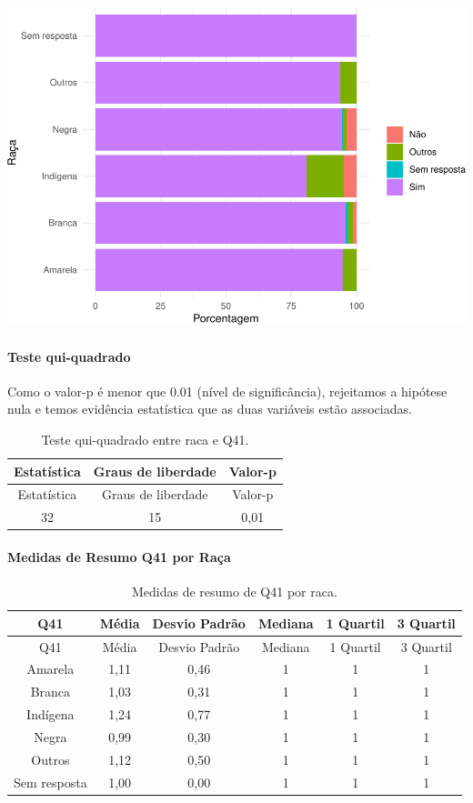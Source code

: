 \documentclass[]{article}
\let\oldparagraph\paragraph
\renewcommand{\paragraph}[1]{\oldparagraph{#1}\mbox{}}
\begin{document}
\begin{center}\includegraphics[width=0.75\linewidth]{relatorio_covid19_files/figure-latex/unnamed-chunk-1636-1} \end{center}

\hypertarget{teste-qui-quadrado-140}{%
\paragraph{Teste qui-quadrado}\label{teste-qui-quadrado-140}}

Como o valor-p é menor que 0.01 (nível de significância), rejeitamos a hipótese nula e temos evidência estatística que as duas variáveis estão associadas.

\begin{longtable}[]{@{}ccc@{}}
\caption{\label{tab:unnamed-chunk-1638}Teste qui-quadrado entre raca e Q41.}\tabularnewline
\toprule
Estatística & Graus de liberdade & Valor-p\tabularnewline
\midrule
\endfirsthead
\toprule
Estatística & Graus de liberdade & Valor-p\tabularnewline
\midrule
\endhead
32 & 15 & 0,01\tabularnewline
\bottomrule
\end{longtable}

\cleardoublepage

\hypertarget{medidas-de-resumo-q41-por-rauxe7a}{%
\paragraph{Medidas de Resumo Q41 por Raça}\label{medidas-de-resumo-q41-por-rauxe7a}}

\begin{longtable}[]{@{}cccccc@{}}
\caption{\label{tab:unnamed-chunk-1639}Medidas de resumo de Q41 por raca.}\tabularnewline
\toprule
Q41 & Média & Desvio Padrão & Mediana & 1 Quartil & 3 Quartil\tabularnewline
\midrule
\endfirsthead
\toprule
Q41 & Média & Desvio Padrão & Mediana & 1 Quartil & 3 Quartil\tabularnewline
\midrule
\endhead
Amarela & 1,11 & 0,46 & 1 & 1 & 1\tabularnewline
Branca & 1,03 & 0,31 & 1 & 1 & 1\tabularnewline
Indígena & 1,24 & 0,77 & 1 & 1 & 1\tabularnewline
Negra & 0,99 & 0,30 & 1 & 1 & 1\tabularnewline
Outros & 1,12 & 0,50 & 1 & 1 & 1\tabularnewline
Sem resposta & 1,00 & 0,00 & 1 & 1 & 1\tabularnewline
\bottomrule
\end{longtable}
\end{document}

